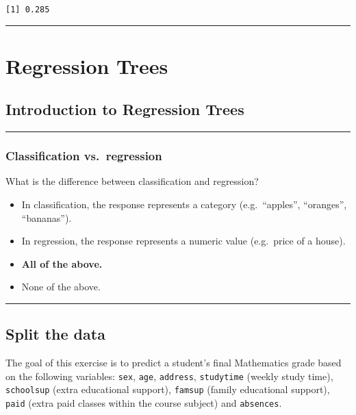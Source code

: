 \documentclass[
]{book}
\begin{document}
\begin{verbatim}
[1] 0.285
\end{verbatim}

\begin{center}\rule{0.5\linewidth}{0.5pt}\end{center}

\hypertarget{regression-trees}{%
\chapter{Regression Trees}\label{regression-trees}}

\hypertarget{introduction-to-regression-trees}{%
\section{Introduction to Regression Trees}\label{introduction-to-regression-trees}}

\begin{center}\rule{0.5\linewidth}{0.5pt}\end{center}

\hypertarget{classification-vs.-regression}{%
\subsection{Classification vs.~regression}\label{classification-vs.-regression}}

What is the difference between classification and regression?

\begin{itemize}
\item
  In classification, the response represents a category (e.g.~``apples'', ``oranges'', ``bananas'').
\item
  In regression, the response represents a numeric value (e.g.~price of a house).
\item
  \textbf{All of the above.}
\item
  None of the above.
\end{itemize}

\begin{center}\rule{0.5\linewidth}{0.5pt}\end{center}

\hypertarget{split-the-data}{%
\section{Split the data}\label{split-the-data}}

The goal of this exercise is to predict a student's final Mathematics grade based on the following variables: \texttt{sex}, \texttt{age}, \texttt{address}, \texttt{studytime} (weekly study time), \texttt{schoolsup} (extra educational support), \texttt{famsup} (family educational support), \texttt{paid} (extra paid classes within the course subject) and \texttt{absences}.
\end{document}
